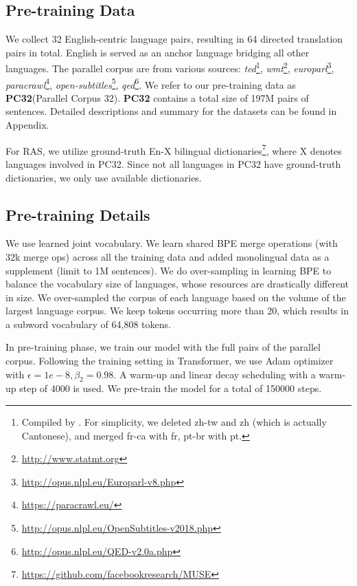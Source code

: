 \documentclass[11pt,a4paper]{article}
\newcommand{\dataset}{PC32\xspace}
\begin{document}
\subsection{Pre-training Data}

We collect 32 English-centric language pairs, resulting in 64 directed translation pairs in total. English is served as an anchor language bridging all other languages. 
The parallel corpus are from various sources: \textit{ted}\footnote{Compiled by \citet{DBLP:conf/naacl/QiSFPN18}. For simplicity, we deleted zh-tw and zh (which is actually Cantonese), and merged fr-ca with fr, pt-br with pt.}, \textit{wmt}\footnote{\url{http://www.statmt.org}}, \textit{europarl}\footnote{\url{http://opus.nlpl.eu/Europarl-v8.php}}, \textit{paracrawl}\footnote{\url{https://paracrawl.eu/}}, \textit{open-subtitles}\footnote{\url{http://opus.nlpl.eu/OpenSubtitles-v2018.php}}, \textit{qed}\footnote{\url{http://opus.nlpl.eu/QED-v2.0a.php}}. 
We refer to our pre-training data as \textbf{\dataset}(Parallel Corpus 32). 
\textbf{\dataset} contains a total size of 197M pairs of sentences.
Detailed descriptions and summary for the datasets can be found in Appendix.



For RAS, we utilize ground-truth En-X bilingual dictionaries\footnote{\url{https://github.com/facebookresearch/MUSE}}, where X denotes languages involved in \dataset. Since not all languages in \dataset have ground-truth dictionaries, we only use available dictionaries.





\subsection{Pre-training Details}

We use learned joint vocabulary. We learn shared BPE \cite{sennrich2015neural} merge operations (with 32k merge ops) across all the training data and added monolingual data as a supplement (limit to 1M sentences).
We do over-sampling in learning BPE to balance the vocabulary size of languages, whose resources are drastically different in size. We over-sampled the corpus of each language based on the volume of the largest language corpus. We keep tokens occurring more than 20, which results in a subword vocabulary of 64,808 tokens.

In pre-training phase, we train our model with the full pairs of the parallel corpus. Following the training setting in Transformer, we use Adam optimizer with $\epsilon=1e-8,\beta_2 = 0.98$. A warm-up and linear decay scheduling with a warm-up step of 4000 is used. We pre-train the model for a total of 150000 steps. 
\end{document}
